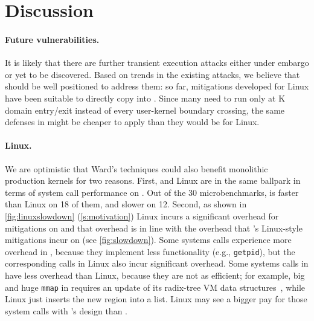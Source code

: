 \section*{Discussion}
\label{s:discussion}

\paragraph{Future vulnerabilities.}

It is likely that there are further transient
execution attacks either under embargo or yet to be discovered. Based on trends
in the existing attacks, we believe that \sys should be well positioned to
address them: so far, mitigations developed for Linux have been suitable to
directly copy into \sys. Since many need to run only at K domain entry/exit
instead of every user-kernel boundary crossing, the same defenses in \sys
might be cheaper to apply than they would be for Linux.

\paragraph{Linux.}


We are optimistic that Ward's techniques could also benefit monolithic
production kernels for two reasons.
First, \sys and Linux are in the same ballpark in terms of system call
performance on \bench.  Out of the 30 microbenchmarks, \sys is faster than
Linux on 18 of them, and slower on 12.
Second, as shown in \autoref{fig:linuxslowdown} (\autoref{s:motivation})
Linux incurs a significant overhead for mitigations on \bench and that
overhead is in line with the overhead that \sys's Linux-style mitigations
incur on \bench (see
\autoref{fig:slowdown}).  Some systems calls experience more overhead in
\sys, because they implement less functionality (e.g., \texttt{getpid}),
but the corresponding calls in Linux also incur significant overhead.
Some systems calls in \sys have less overhead than Linux, because they are
not as efficient; for example, big and huge \texttt{mmap} in \sys requires
an update of its radix-tree VM data structures~\cite{clements:radixvm},
while Linux just inserts the new region into a list. Linux may see a
bigger pay for those system calls with \sys's design than \sys.

